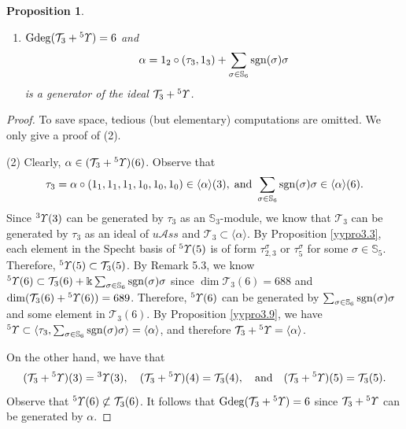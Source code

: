 \documentclass{amsart}
\newtheorem{prop}[thm]{Proposition}
\theoremstyle{definition}
\theoremstyle{remark}
\numberwithin{equation}{section}
\def\S{\mathbb{S}}
\def\sgn{{\rm sgn}}
\def\gd{\operatorname{Gdeg}}
\newcommand{\lr}[1]{\langle #1 \rangle}
\newcommand{\up}[1]{{^{#1}{\it \!\Upsilon}}}
\def \uas{u\mathcal{A}ss}
\def \dim{\operatorname{dim}}
\def \S{\mathbb{S}}
\def\T{\mathcal{T}}
\begin{document}
\begin{prop}
\begin{enumerate}
\begin{center}
\begin{tabular}{|c|c|c|}
$V_{(2^2)}$  & $1_2\circ (\zeta_{(2^2)}, 1_2)
+1_2\circ (\beta_5, 1_1)+\beta_6$       & $6$ \\ \hline
$0$      & $\beta_6$ & $6$ \\ \hline  
\end{tabular}
\end{center}
where 
\begin{equation}
\label{E5.5.2}\tag{E5.5.2}
\beta_5:=\tau_{2, 3}\ast (5, 4, 3, 2, 1)
+\tau_5\ast (5, 4, 3, 2, 1)
\end{equation} 
is a generator of $\up{5}(5)$ and 
\begin{equation}
\label{E5.5.3}\tag{E5.5.3}
\beta_6:=\tau_{2, 2, 2}\ast (2, 1, 4, 3, 6, 5)
+\tau_{2, 4}\ast (6, 5, 4, 3, 2, 1)
+\tau_{3, 3}\ast (3, 2, 1, 6, 5, 4)
+\tau_6\ast (6, 5, 4, 3,2, 1)
\end{equation}
is a generator of $\up{6}(6)$. 
\item[(2)]
$\gd(\T_3+\up{5})=6$ and 
\[\alpha=1_2\circ (\tau_3, 1_3)+\sum_{\sigma\in \S_6}\sgn(\sigma)\sigma\]
is a generator of the ideal $\T_3+\up{5}$.
\end{enumerate}
\end{prop}

\begin{proof}
To save space, tedious (but elementary) computations 
are omitted. We only give a proof of (2). 

(2) Clearly, $\alpha\in (\T_3+\up{5})(6)$. Observe that 
\[\tau_3=\alpha\circ (1_1, 1_1, 1_1, 1_0, 1_0, 1_0)\in 
\lr{\alpha}(3), \; {\rm and}\ \sum_{\sigma\in \S_6}
\sgn(\sigma)\sigma\in \lr{\alpha}(6).\]
Since $\up{3}(3)$ can be generated by $\tau_3$ as an 
$\S_3$-module, we know that $\T_3$ can be generated by 
$\tau_3$ as an ideal of $\uas$ and $\T_3\subset \lr{\alpha}$. 
By Proposition \ref{yypro3.3}, each element in the Specht 
basis of $\up{5}(5)$ is of form $\tau_{2, 3}^\sigma$ or 
$\tau_5^\sigma$ for some $\sigma\in \S_5$. Therefore, 
$\up{5}(5)\subset \T_3(5)$. By Remark 5.3, we know 
$\up{5}(6)\subset \T_3(6)+\Bbbk \sum_{\sigma\in \S_6}
\sgn(\sigma)\sigma$ since $\dim \T_3(6)=688$ and 
$\dim (\T_3(6)+\up{5}(6))=689$. Therefore, $\up{5}(6)$ 
can be generated by $\sum_{\sigma\in \S_6}\sgn(\sigma)\sigma$ 
and some element in $\T_3(6)$. By Proposition 
\ref{yypro3.9}, 
we have $\up{5}\subset \lr{\tau_3, \sum_{\sigma\in \S_6}
\sgn(\sigma)\sigma}=\lr{\alpha}$, and therefore 
$\T_3+\up{5}=\lr{\alpha}$. 

On the other hand, we have that
\[(\T_3+\up{5})(3)=\up{3}(3),
\quad (\T_3+\up{5})(4)=\T_3(4), 
\quad {\rm and}
\quad (\T_3+\up{5})(5)=\T_3(5).\]
Observe that $\up{5}(6)\not\subset \T_3(6)$. It follows that 
$\gd(\T_3+\up{5})=6$ since $\T_3+\up{5}$ can be generated by 
$\alpha$.
\end{proof}
\end{document}
